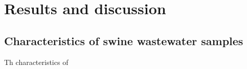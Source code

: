 \section{Results and discussion}
\subsection{Characteristics of swine wastewater samples}
Th characteristics of 